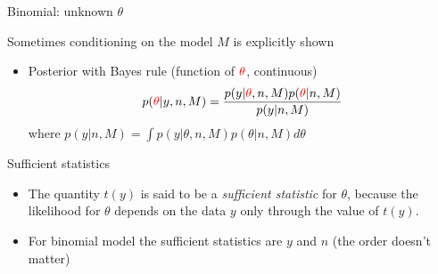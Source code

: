\documentclass[english,t]{beamer}
\begin{document}
\begin{frame}{Binomial: unknown $\theta$}

  Sometimes conditioning on the model $M$ is explicitly shown
  
  \begin{itemize}
  \item {\color{blue}Posterior} with Bayes rule (function of ${\color{red}\theta}$, continuous)
    \begin{equation*}
      p({\color{red}\theta}|y,n,M)=\frac{p(y|{\color{red}\theta},n,M)p({\color{red}\theta}|n,M)}{p(y|n,M)}
    \end{equation*}
    where $p(y|n,M)=\int p(y|\theta,n,M)p(\theta|n,M) d\theta$
    \vspace{0.5\baselineskip}
  \end{itemize}

\end{frame}

\begin{frame}{Sufficient statistics}

  \begin{itemize}
  \item<+-> The quantity $t(y)$ is said to be a {\em sufficient statistic}
    for $\theta$, because the likelihood for $\theta$ depends on the
    data $y$ only through the value of $t(y)$.
  \item<+-> For binomial model the sufficient statistics are $y$ and
    $n$ (the order doesn't matter)
  \end{itemize}

\end{frame}

\end{document}
